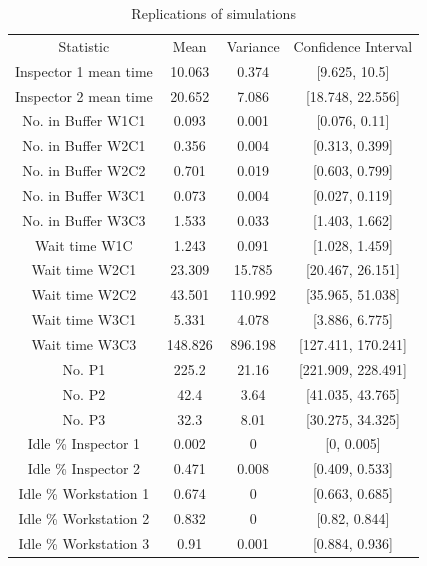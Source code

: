 \documentclass{article}
\begin{document}
\begin{table}[htp]
\caption{Replications of simulations}
\begin{center}
\begin{tabular}{cccc}
\hline
Statistic & Mean & Variance & Confidence Interval\\
Inspector 1 mean time&10.063&0.374&[9.625, 10.5]\\
Inspector 2 mean time&20.652&7.086&[18.748, 22.556]\\
No. in Buffer W1C1&0.093&0.001&[0.076, 0.11]\\
No. in Buffer W2C1&0.356&0.004&[0.313, 0.399]\\
No. in Buffer W2C2&0.701&0.019&[0.603, 0.799]\\
No. in Buffer W3C1&0.073&0.004&[0.027, 0.119]\\
No. in Buffer W3C3&1.533&0.033&[1.403, 1.662]\\
Wait time W1C&1.243&0.091&[1.028, 1.459]\\
Wait time W2C1&23.309&15.785&[20.467, 26.151]\\
Wait time W2C2&43.501&110.992&[35.965, 51.038]\\
Wait time W3C1&5.331&4.078&[3.886, 6.775]\\
Wait time W3C3&148.826&896.198&[127.411, 170.241]\\
No. P1&225.2&21.16&[221.909, 228.491]\\
No. P2&42.4&3.64&[41.035, 43.765]\\
No. P3&32.3&8.01&[30.275, 34.325]\\
Idle \% Inspector 1&0.002&0&[0, 0.005]\\
Idle \% Inspector 2&0.471&0.008&[0.409, 0.533]\\
Idle \% Workstation 1&0.674&0&[0.663, 0.685]\\
Idle \% Workstation 2&0.832&0&[0.82, 0.844]\\
Idle \% Workstation 3&0.91&0.001&[0.884, 0.936]\\
\hline

\end{tabular}
\end{center}
\label{default}
\end{table}%
\end{document}
